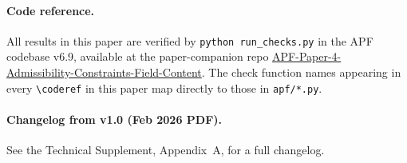 \documentclass[11pt]{article}
\theoremstyle{definition}
\begin{document}
\paragraph{Code reference.} All results in this paper are verified by \texttt{python run\_checks.py} in the APF codebase v6.9, available at the paper-companion repo \href{https://github.com/Ethan-Brooke/APF-Paper-4-Admissibility-Constraints-Field-Content}{APF-Paper-4-Admissibility-Constraints-Field-Content}. The check function names appearing in every \texttt{\textbackslash coderef} in this paper map directly to those in \texttt{apf/*.py}.

\paragraph{Changelog from v1.0 (Feb 2026 PDF).} See the Technical Supplement, Appendix~A, for a full changelog.
\end{document}

